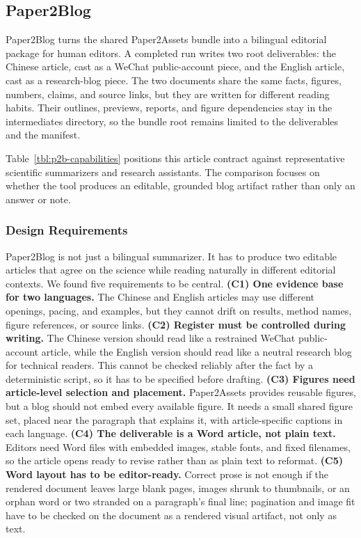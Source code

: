 \documentclass{article}
\begin{document}
\subsection{Paper2Blog}\label{sec:p2b}

Paper2Blog turns the shared Paper2Assets bundle into a bilingual editorial package for human editors. A completed run writes two root deliverables: the Chinese article, cast as a WeChat public-account piece, and the English article, cast as a research-blog piece. The two documents share the same facts, figures, numbers, claims, and source links, but they are written for different reading habits. Their outlines, previews, reports, and figure dependencies stay in the intermediates directory, so the bundle root remains limited to the deliverables and the manifest.

Table~\ref{tbl:p2b-capabilities} positions this article contract against representative scientific summarizers and research assistants. The comparison focuses on whether the tool produces an editable, grounded blog artifact rather than only an answer or note.

\subsubsection{Design Requirements}

Paper2Blog is not just a bilingual summarizer. It has to produce two editable articles that agree on the science while reading naturally in different editorial contexts. We found five requirements to be central. \textbf{(C1) One evidence base for two languages.} The Chinese and English articles may use different openings, pacing, and examples, but they cannot drift on results, method names, figure references, or source links. \textbf{(C2) Register must be controlled during writing.} The Chinese version should read like a restrained WeChat public-account article, while the English version should read like a neutral research blog for technical readers. This cannot be checked reliably after the fact by a deterministic script, so it has to be specified before drafting. \textbf{(C3) Figures need article-level selection and placement.} Paper2Assets provides reusable figures, but a blog should not embed every available figure. It needs a small shared figure set, placed near the paragraph that explains it, with article-specific captions in each language. \textbf{(C4) The deliverable is a Word article, not plain text.} Editors need Word files with embedded images, stable fonts, and fixed filenames, so the article opens ready to revise rather than as plain text to reformat. \textbf{(C5) Word layout has to be editor-ready.} Correct prose is not enough if the rendered document leaves large blank pages, images shrunk to thumbnails, or an orphan word or two stranded on a paragraph's final line; pagination and image fit have to be checked on the document as a rendered visual artifact, not only as text.
\end{document}
